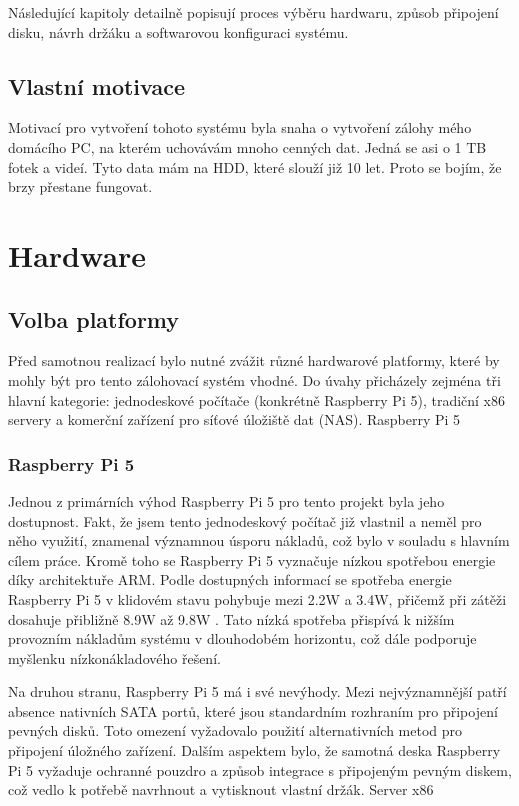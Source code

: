 \documentclass[a4paper,12pt, oneside]{book}
\begin{document}
Následující kapitoly detailně popisují
proces výběru hardwaru, způsob připojení disku, návrh držáku a softwarovou
konfiguraci systému.


\section{Vlastní motivace}

Motivací pro vytvoření tohoto systému byla snaha o vytvoření zálohy mého
domácího PC, na kterém uchovávám mnoho cenných dat.
Jedná se asi o 1 TB fotek a videí. Tyto data mám na HDD, které
slouží již 10 let. Proto se bojím, že brzy přestane fungovat. 


\chapter{Hardware}
\section{Volba platformy}

Před samotnou realizací bylo nutné zvážit různé hardwarové platformy, které by
mohly být pro tento zálohovací systém vhodné. Do úvahy přicházely zejména tři
hlavní kategorie: jednodeskové počítače (konkrétně Raspberry Pi 5), tradiční x86
servery a komerční zařízení pro síťové úložiště dat (NAS). Raspberry Pi 5

\subsection{Raspberry Pi 5}

Jednou z primárních výhod Raspberry Pi 5 pro tento projekt byla jeho dostupnost.
Fakt, že jsem tento jednodeskový počítač již vlastnil a neměl pro něho využití,
znamenal významnou úsporu nákladů, což bylo v souladu s hlavním cílem
práce. Kromě toho se Raspberry Pi 5 vyznačuje nízkou spotřebou energie díky
architektuře ARM. Podle dostupných informací se spotřeba energie Raspberry Pi 5
v klidovém stavu pohybuje mezi 2.2W a 3.4W, přičemž při zátěži dosahuje
přibližně 8.9W až 9.8W . Tato nízká spotřeba přispívá k nižším provozním
nákladům systému v dlouhodobém horizontu, což dále podporuje myšlenku
nízkonákladového řešení.  

Na druhou stranu, Raspberry Pi 5 má i své nevýhody. Mezi nejvýznamnější patří
absence nativních SATA portů, které jsou standardním rozhraním pro připojení
pevných disků. Toto omezení vyžadovalo použití alternativních metod pro
připojení úložného zařízení. Dalším aspektem bylo, že samotná deska Raspberry Pi
5 vyžaduje ochranné pouzdro a způsob integrace s připojeným pevným diskem, což
vedlo k potřebě navrhnout a vytisknout vlastní držák. Server x86
\end{document}
